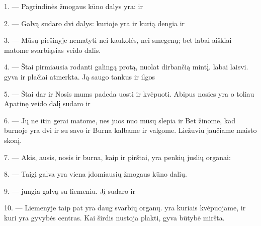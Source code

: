 \VUsaut{4.0mm}
\VUsaut{2.0mm}

\VUsaut{2.4mm}
\VUsaut{3.0mm}

1. --- Pagrindinės žmogaus kūno dalys yra:   ir

\VUsaut{3.0mm}

2. --- Galvą sudaro dvi dalys:  kurioje yra  ir
kurią dengia  ir 

3. --- Mūsų piešinyje nematyti nei kaukolės, nei smegenų; bet labai aiškiai matome
svarbiąsias veido dalis.

4. --- Štai pirmiausia  rodanti galingą protą, nuolat dirbančią
mintį.  labai laisvi.  gyva ir plačiai atmerkta. Ją
saugo tankus  ir ilgos 

5. --- Štai dar  ir  Nosis mums padeda uosti ir
kvėpuoti. Abipus nosies yra  o toliau  Apatinę
veido dalį sudaro  ir 

6. --- Jų ne itin gerai matome, nes juos nuo mūsų slepia  ir
 Bet žinome, kad burnoje yra dvi  
ir  su savo  ir  Burna
kalbame ir valgome. Liežuviu jaučiame maisto skonį.

7. --- Akis, ausis, nosis ir burna, kaip ir pirštai, yra penkių juslių organai:
    

8. --- Taigi galva yra viena įdomiausių žmogaus kūno dalių.

\VUsaut{4.4mm}
\VUsaut{3.0mm}

9. ---  jungia galvą su liemeniu. Jį sudaro  ir

10. --- Liemenyje taip pat yra daug svarbių organų.  yra
 kuriais kvėpuojame, ir  kuri yra gyvybės centras.
Kai širdis nustoja plakti, gyva būtybė miršta.


